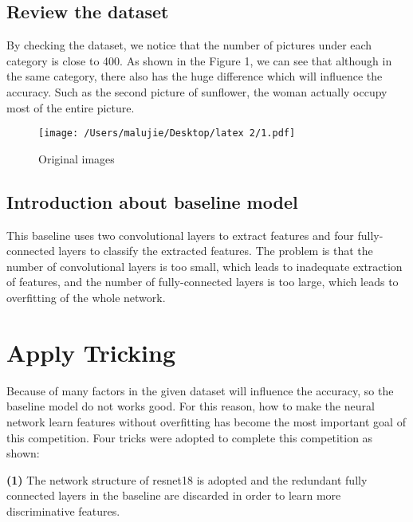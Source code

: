 \documentclass[10pt,twocolumn,letterpaper]{article}
\begin{document}
\subsection{Review the dataset}

By checking the dataset, we notice that the number of pictures under each category is close to 400.
As shown in the Figure 1, we can see that although in the same category, there also has the huge difference which will influence the accuracy.
Such as the second picture of sunflower, the woman actually occupy most of the entire picture.

\begin{figure}[htp]
  \centering
   \texttt{[image: /Users/malujie/Desktop/latex 2/1.pdf]}

   \caption{Original images}
\end{figure}


\subsection{Introduction about baseline model}

This baseline uses two convolutional layers to extract features and four fully-connected layers to classify the extracted features.
The problem is that the number of convolutional layers is too small, which leads to inadequate extraction of features, and the number of fully-connected layers is too large, which leads to overfitting of the whole network.

\section{Apply Tricking}

Because of many factors in the given dataset will influence the accuracy, so the baseline model do not works good.
For this reason, how to make the neural network learn features without overfitting has become the most important goal of this competition.
Four tricks were adopted to complete this competition as shown:

\textbf{(1)} The network structure of resnet18 is adopted and the redundant fully connected layers in the baseline are discarded in order to learn more discriminative features. ~\cite{https://doi.org/10.48550/arxiv.1512.03385}
\end{document}
